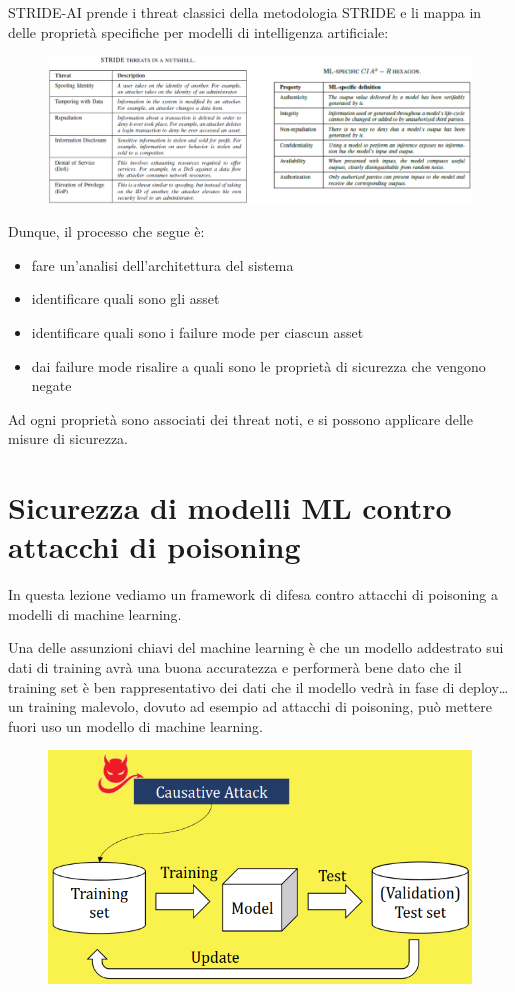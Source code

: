 \documentclass{report}
\begin{document}
\noindent STRIDE-AI prende i threat classici della metodologia STRIDE e li mappa in delle proprietà specifiche per modelli di intelligenza artificiale:

\begin{figure}[H]
    \centering
    \includegraphics[width=1\linewidth]{images/mapping.png}
\end{figure}


\noindent Dunque, il processo che segue è:
\begin{itemize}
    \item fare un'analisi dell'architettura del sistema
    \item identificare quali sono gli asset 
    \item identificare quali sono i failure mode per ciascun asset 
    \item dai failure mode risalire a quali sono le proprietà di sicurezza che vengono negate
\end{itemize}

\noindent Ad ogni proprietà sono associati dei threat noti, e si possono applicare delle misure di sicurezza.



\chapter{Sicurezza di modelli ML contro attacchi di poisoning}

In questa lezione vediamo un framework di difesa contro attacchi di poisoning a modelli di 
machine learning.

\noindent Una delle assunzioni chiavi del machine learning è che un modello addestrato sui dati di training avrà una buona accuratezza e performerà 
bene dato che il training set è ben rappresentativo dei dati che il modello vedrà in fase di deploy\dots un training malevolo, dovuto 
ad esempio ad attacchi di poisoning, può mettere fuori uso un modello di machine learning.

\begin{figure}[H]
    \centering
    \includegraphics[width=0.7\linewidth]{images/poison.png}
\end{figure}
\end{document}
